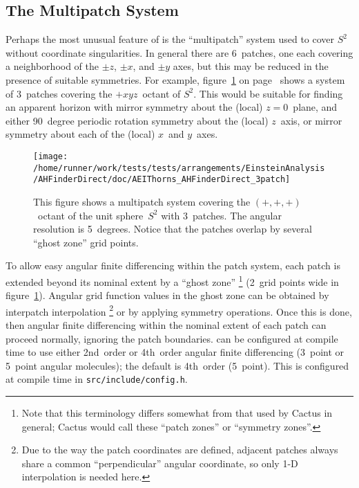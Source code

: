 
\subsection{The Multipatch System}
\label{AHFinderDirect/sect-multipatch-system}

Perhaps the most unusual feature of  is the
``multipatch'' system used to cover $S^2$ without coordinate singularities.
In general there are 6~patches, one each covering a neighborhood of
the $\pm z$, $\pm x$, and $\pm y$ axes, but this may be reduced in
the presence of suitable symmetries.  For example,
figure~\ref{AHFinderDirect/fig-3patch}
on page~\pageref{AHFinderDirect/fig-3patch} shows a system
of 3~patches covering the $+xyz$~octant of $S^2$.  This would be
suitable for finding an apparent horizon with mirror symmetry about
the (local) $z=0$~plane, and either 90~degree periodic rotation symmetry
about the (local) $z$~axis, or mirror symmetry about each of the (local)
$x$~and $y$~axes.

\begin{figure}[htbp]
\begin{center}
\texttt{[image: /home/runner/work/tests/tests/arrangements/EinsteinAnalysis/AHFinderDirect/doc/AEIThorns\_AHFinderDirect\_3patch]}
\end{center}
\caption[Illustration of the Multipatch System]
	{
	This figure shows a multipatch system covering the
	$(+,+,+)$~octant of the unit sphere~$S^2$ with 3~patches.
	The angular resolution is 5~degrees.  Notice that the
	patches overlap by several ``ghost zone'' grid points.
	}
\label{AHFinderDirect/fig-3patch}
\end{figure}

To allow easy angular finite differencing within the patch system,
each patch is extended beyond its nominal extent by a ``ghost zone''%
\footnote{%
	 Note that this terminology differs somewhat
	 from that used by Cactus in general; Cactus
	 would call these ``patch zones'' or ``symmetry
	 zones''.
	 }%
{} (2~grid points wide in figure~\ref{AHFinderDirect/fig-3patch}).
Angular grid function values in the ghost zone can be obtained by
interpatch interpolation%
\footnote{%
	 Due to the way the patch coordinates are defined,
	 adjacent patches always share a common ``perpendicular''
	 angular coordinate, so only 1-D interpolation
	 is needed here.
	 }%
{} or by applying symmetry operations.  Once this is done, then angular
finite differencing within the nominal extent of each patch can proceed
normally, ignoring the patch boundaries.   can
be configured at compile time to use either 2nd~order or 4th~order
angular finite differencing (3~point or 5~point angular molecules);
the default is 4th~order (5~point).  This is configured at compile time
in \verb|src/include/config.h|.

